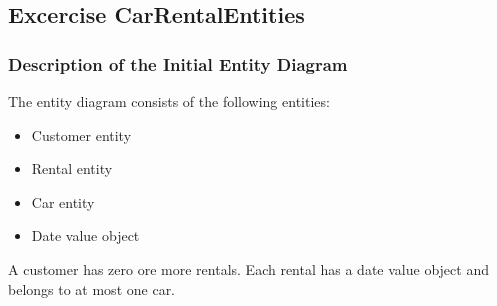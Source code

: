 \label{cha:design_of_data_and_functionality}

\subsection{Excercise CarRentalEntities}
\label{sec:exercise_car_rental_entities}
\subsubsection*{Description of the Initial Entity Diagram}
The entity diagram consists of the following entities:
\begin{itemize}
    \item Customer entity
    \item Rental entity
    \item Car entity
    \item Date value object
\end{itemize}
A customer has zero ore more rentals.
Each rental has a date value object and belongs to at most one car.


